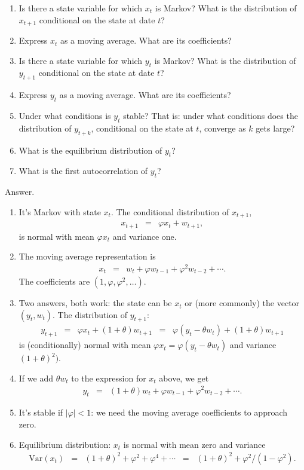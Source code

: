 \documentclass[11pt]{article}
\begin{document}
\begin{enumerate}
\begin{enumerate}
\item Is there a state variable for which $x_t$ is Markov?
What is the distribution of $x_{t+1}$ conditional on the state at date $t$?
\item Express $x_t$ as a moving average.
What are its coefficients?
\item Is there a state variable for which $y_t$ is Markov?
What is the distribution of $y_{t+1}$ conditional on the state at date $t$?
\item Express $y_t$ as a moving average.
What are its coefficients?
\item Under what conditions is $y_t$ stable?
That is: under what conditions does the distribution of $y_{t+k}$,
conditional on the state at $t$, converge as $k$ gets large?
\item What is the equilibrium distribution of $y_t$?
\item What is the first autocorrelation of $y_t$?
\end{enumerate}
%
Answer.
\begin{enumerate}
\item It's Markov with state $x_t$.
The conditional distribution of $x_{t+1}$,
\begin{eqnarray*}
    x_{t+1} &=& \varphi x_{t} + w_{t+1},
\end{eqnarray*}
is normal with mean $\varphi x_t $ and variance one.
\item The moving average representation is
\begin{eqnarray*}
    x_{t} &=& w_t + \varphi w_{t-1} + \varphi^2 w_{t-2}  + \cdots .
\end{eqnarray*}
The coefficients are $(1,\varphi, \varphi^2, \ldots )$.
\item Two answers, both work:  the state can be $x_t$ or (more commonly)
the vector $(y_t,w_t)$.
The distribution of $y_{t+1}$:
\begin{eqnarray*}
    y_{t+1} &=& \varphi x_t + (1+\theta) w_{t+1}
                \;\;=\;\; \varphi (y_t - \theta w_t) + (1+\theta) w_{t+1}
\end{eqnarray*}
is (conditionally) normal with mean $\varphi x_t = \varphi (y_t - \theta w_t)$
and variance $(1+\theta)^2)$.
\item If we add $\theta w_t$ to the expression for $x_t$ above, we get
\begin{eqnarray*}
    y_{t} &=& (1+\theta) w_t + \varphi w_{t-1} + \varphi^2 w_{t-2}  + \cdots .
\end{eqnarray*}
\item It's stable if $|\varphi| < 1$:  we need the moving average coefficients
 to approach zero.
 \item Equilibrium distribution:  $x_t$ is normal with mean zero
 and variance
 \begin{eqnarray*}
    \mbox{Var}(x_t) &=& (1+\theta)^2 + \varphi^2 + \varphi^4 + \cdots
            \;\;=\;\; (1+\theta)^2 + \varphi^2/(1-\varphi^2) .
 \end{eqnarray*}
\end{enumerate}


\end{enumerate}
\end{document}
